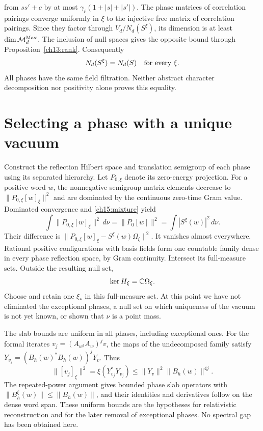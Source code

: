 from $ss'+c$ by at most $\gamma_\ell(1+|s|+|s'|)$.
The phase matrices of correlation pairings converge uniformly in $\xi$ to the
injective free matrix of correlation pairings. Since they factor through
$V_d/N_d(S^\xi)$, its dimension is at least $\dim\mathcal M_d^{\rm Max}$.
The inclusion of null spaces gives the opposite bound through
Proposition~\ref{ch13:rank}. Consequently
\begin{equation}
                         N_d(S^\xi)=N_d(S)
                      \quad\hbox{for every }\xi.
 \label{ch15:same-fields}
\end{equation}
All phases have the same field filtration. Neither abstract character
decomposition nor positivity alone proves this equality.

\section{Selecting a phase with a unique vacuum}
\label{ch15:selection}

Construct the reflection Hilbert space and translation semigroup of each
phase using its separated hierarchy. Let $P_{0,\xi}$ denote its zero-energy
projection. For a positive word $w$, the nonnegative semigroup matrix
elements decrease to $\|P_{0,\xi}[w]_\xi\|^2$ and are dominated by
the continuous zero-time Gram value. Dominated convergence and
\eqref{ch15:mixture} yield
\[
 \int\|P_{0,\xi}[w]_\xi\|^2\,d\nu=\|P_0[w]\|^2
                         =\int|S^\xi(w)|^2\,d\nu.
\]
Their difference is
$\|P_{0,\xi}[w]_\xi-S^\xi(w)\Omega_\xi\|^2$. It vanishes almost
everywhere. Rational positive configurations with basis fields form
one countable family dense in every phase reflection space, by Gram
continuity. Intersect its full-measure sets. Outside the resulting
null set,
\begin{equation}
                       \ker H_\xi=\mathbb C\Omega_\xi.
 \label{ch15:ae-ground}
\end{equation}
Choose and retain one $\xi_*$ in this full-measure set. At this point
we have not eliminated the exceptional phases, a null set on which uniqueness of the vacuum is not yet known, or shown that $\nu$ is a
point mass.

The slab bounds are uniform in all phases, including exceptional
ones. For the formal iterates $v_j=(A_{w^\dagger}A_w)^jv$, the maps of the
undecomposed family satisfy
$Y_{v_j}=(B_h(w)^*B_h(w))^jY_v$. Thus
\[
 \|[v_j]_\xi\|^2=\xi(Y_{v_j}^*Y_{v_j})
                   \le\|Y_v\|^2\|B_h(w)\|^{4j}.
\]
The repeated-power argument gives bounded phase slab operators with
$\|B_h^\xi(w)\|\le\|B_h(w)\|$, and their identities and derivatives
follow on the dense word span. These uniform bounds are the hypotheses for
relativistic reconstruction and for the later removal of exceptional
phases. No spectral gap has been obtained here.


